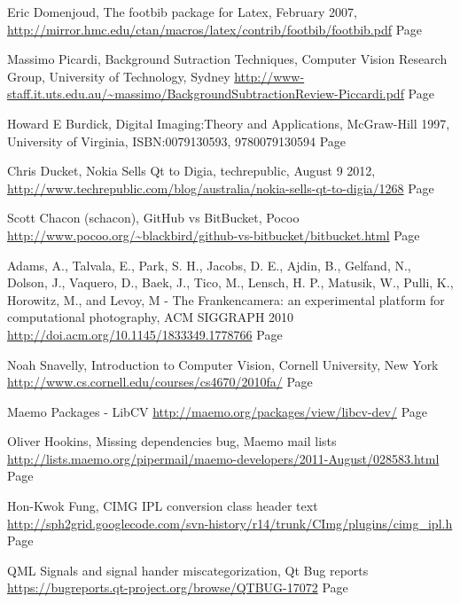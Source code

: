 \documentclass[11pt]{article} %
\begin{document}
\begin{thebibliography}{9}
Eric Domenjoud, The footbib package for Latex, February 2007, 
\url{http://mirror.hmc.edu/ctan/macros/latex/contrib/footbib/footbib.pdf}
Page~\pageref{ref:footbibpack}

Massimo Picardi, Background Sutraction Techniques, Computer Vision Research Group, University of Technology, Sydney
\url{http://www-staff.it.uts.edu.au/~massimo/BackgroundSubtractionReview-Piccardi.pdf}
Page~\pageref{ref:backsub}

Howard E Burdick, Digital Imaging:Theory and Applications, McGraw-Hill  1997, University of Virginia, ISBN:0079130593, 9780079130594
Page~\pageref{ref:digim}

Chris Ducket, Nokia Sells Qt to Digia, techrepublic, August 9 2012, 
\url{http://www.techrepublic.com/blog/australia/nokia-sells-qt-to-digia/1268}
Page~\pageref{ref:nokiasell}

Scott Chacon (schacon), GitHub vs BitBucket, Pocoo
\url{http://www.pocoo.org/~blackbird/github-vs-bitbucket/bitbucket.html}
Page~\pageref{ref:gitvs}

Adams, A., Talvala, E., Park, S. H., Jacobs, D. E., Ajdin, B., Gelfand, N., Dolson, J., Vaquero, D., Baek, J., Tico, M., Lensch, H. P., Matusik, W., Pulli, K., Horowitz, M., and Levoy, M -  The Frankencamera: an experimental platform for computational photography, ACM SIGGRAPH 2010 \url{http://doi.acm.org/10.1145/1833349.1778766} Page~\pageref{ref:fcamdoc}

Noah Snavelly, Introduction to Computer Vision,
Cornell University, New York
\url{http://www.cs.cornell.edu/courses/cs4670/2010fa/}
Page~\pageref{ref:snavelly}

Maemo Packages - LibCV \url{http://maemo.org/packages/view/libcv-dev/}
Page~\pageref{ref:libcv}

Oliver Hookins, Missing dependencies bug, Maemo mail lists
\url{http://lists.maemo.org/pipermail/maemo-developers/2011-August/028583.html}
Page ~\pageref{ref:depbug}

Hon-Kwok Fung, CIMG IPL conversion class header text
\url{http://sph2grid.googlecode.com/svn-history/r14/trunk/CImg/plugins/cimg_ipl.h}
Page~\pageref{ref:cimgipl}

QML Signals and signal hander miscategorization, Qt Bug reports
\url{https://bugreports.qt-project.org/browse/QTBUG-17072}
Page~\pageref{ref:slotbug}


\end{thebibliography}
\end{document}
